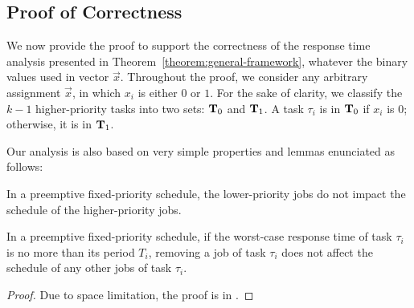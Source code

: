 \subsection{Proof of Correctness}  
\label{sec:proof-th1}

We now provide the proof to support the correctness of the response time analysis presented in
Theorem~\ref{theorem:general-framework}, whatever the binary values
used in vector $\vec{x}$.  %
Throughout the proof, we consider any arbitrary assignment
$\vec{x}$, in which $x_i$ is either $0$ or $1$. For the sake of clarity, we classify the $k-1$
higher-priority tasks into two sets: ${\bf T}_0$ and ${\bf T}_1$. A
task $\tau_i$ is in ${\bf T}_0$ if $x_i$ is $0$; otherwise, it is in
${\bf T}_1$.




Our analysis is also based on very simple properties and lemmas enunciated as follows:

\begin{Property}
\label{prop:lower-priority}
In a preemptive fixed-priority schedule, the lower-priority jobs do not impact the schedule of the higher-priority jobs.
\end{Property}


\begin{Lemma}
\label{lemma:remove-same-task}
In a preemptive fixed-priority schedule, if the worst-case response
time of task $\tau_i$ is no more than its period $T_i$, removing a job of task $\tau_i$ does not affect the schedule of any other jobs of task $\tau_i$.
\end{Lemma}
\begin{proof}
Due to space limitation, the proof is in \citetechreport{}.
\end{proof}


